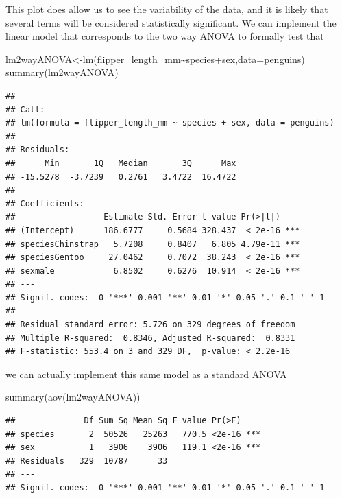 \documentclass[
]{book}
\newenvironment{Shaded}{\begin{snugshade}}{\end{snugshade}}
\newcommand{\AttributeTok}[1]{\textcolor[rgb]{0.77,0.63,0.00}{#1}}
\newcommand{\FunctionTok}[1]{\textcolor[rgb]{0.00,0.00,0.00}{#1}}
\newcommand{\NormalTok}[1]{#1}
\newcommand{\OtherTok}[1]{\textcolor[rgb]{0.56,0.35,0.01}{#1}}
\newcommand{\SpecialCharTok}[1]{\textcolor[rgb]{0.00,0.00,0.00}{#1}}
\begin{document}
This plot does allow us to see the variability of the data, and it is likely that several terms will be considered statistically significant. We can implement the linear model that corresponds to the two way ANOVA to formally test that

\begin{Shaded}
\begin{Highlighting}[]
\NormalTok{lm2wayANOVA}\OtherTok{\textless{}{-}}\FunctionTok{lm}\NormalTok{(flipper\_length\_mm}\SpecialCharTok{\textasciitilde{}}\NormalTok{species}\SpecialCharTok{+}\NormalTok{sex,}\AttributeTok{data=}\NormalTok{penguins)}
\FunctionTok{summary}\NormalTok{(lm2wayANOVA)}
\end{Highlighting}
\end{Shaded}

\begin{verbatim}
## 
## Call:
## lm(formula = flipper_length_mm ~ species + sex, data = penguins)
## 
## Residuals:
##      Min       1Q   Median       3Q      Max 
## -15.5278  -3.7239   0.2761   3.4722  16.4722 
## 
## Coefficients:
##                  Estimate Std. Error t value Pr(>|t|)    
## (Intercept)      186.6777     0.5684 328.437  < 2e-16 ***
## speciesChinstrap   5.7208     0.8407   6.805 4.79e-11 ***
## speciesGentoo     27.0462     0.7072  38.243  < 2e-16 ***
## sexmale            6.8502     0.6276  10.914  < 2e-16 ***
## ---
## Signif. codes:  0 '***' 0.001 '**' 0.01 '*' 0.05 '.' 0.1 ' ' 1
## 
## Residual standard error: 5.726 on 329 degrees of freedom
## Multiple R-squared:  0.8346, Adjusted R-squared:  0.8331 
## F-statistic: 553.4 on 3 and 329 DF,  p-value: < 2.2e-16
\end{verbatim}

we can actually implement this same model as a standard ANOVA

\begin{Shaded}
\begin{Highlighting}[]
\FunctionTok{summary}\NormalTok{(}\FunctionTok{aov}\NormalTok{(lm2wayANOVA))}
\end{Highlighting}
\end{Shaded}

\begin{verbatim}
##              Df Sum Sq Mean Sq F value Pr(>F)    
## species       2  50526   25263   770.5 <2e-16 ***
## sex           1   3906    3906   119.1 <2e-16 ***
## Residuals   329  10787      33                   
## ---
## Signif. codes:  0 '***' 0.001 '**' 0.01 '*' 0.05 '.' 0.1 ' ' 1
\end{verbatim}
\end{document}
